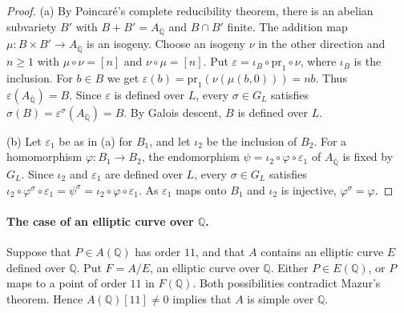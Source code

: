 \documentclass[11pt]{article}
\theoremstyle{remark}
\newcommand{\Q}{\mathbb Q}
\begin{document}
\begin{proof}
(a) By Poincar\'e's complete reducibility theorem, there is an abelian
subvariety \(B'\) with \(B+B'=A_{\overline{\Q}}\) and \(B\cap B'\)
finite. The addition map \(\mu:B\times B'\to A_{\overline{\Q}}\) is an
isogeny. Choose an isogeny \(\nu\) in the other direction and
\(n\geq1\) with \(\mu\circ\nu=[n]\) and \(\nu\circ\mu=[n]\). Put
\(\varepsilon=\iota_B\circ\mathrm{pr}_1\circ\nu\), where \(\iota_B\) is
the inclusion. For \(b\in B\) we get
\(\varepsilon(b)=\mathrm{pr}_1(\nu(\mu(b,0)))=nb\). Thus
\(\varepsilon(A_{\overline{\Q}})=B\). Since \(\varepsilon\) is
defined over \(L\), every \(\sigma\in G_L\) satisfies
\(\sigma(B)=\varepsilon^\sigma(A_{\overline{\Q}})=B\). By Galois
descent, \(B\) is defined over \(L\).

(b) Let \(\varepsilon_1\) be as in (a) for \(B_1\), and let
\(\iota_2\) be the inclusion of \(B_2\). For a homomorphism
\(\varphi:B_1\to B_2\), the endomorphism
\(\psi=\iota_2\circ\varphi\circ\varepsilon_1\) of
\(A_{\overline{\Q}}\) is fixed by \(G_L\). Since \(\iota_2\) and
\(\varepsilon_1\) are defined over \(L\), every \(\sigma\in G_L\)
satisfies \(\iota_2\circ\varphi^\sigma\circ\varepsilon_1=\psi^\sigma
=\iota_2\circ\varphi\circ\varepsilon_1\). As \(\varepsilon_1\) maps
onto \(B_1\) and \(\iota_2\) is injective, \(\varphi^\sigma=\varphi\).
\end{proof}

\paragraph{The case of an elliptic curve over \(\Q\).}
Suppose that \(P\in A(\Q)\) has order \(11\), and that \(A\) contains
an elliptic curve \(E\) defined over \(\Q\). Put \(F=A/E\), an
elliptic curve over \(\Q\). Either \(P\in E(\Q)\), or \(P\) maps to a
point of order \(11\) in \(F(\Q)\). Both possibilities contradict
Mazur's theorem. Hence \(A(\Q)[11]\neq0\) implies that \(A\) is
simple over \(\Q\).
\end{document}
